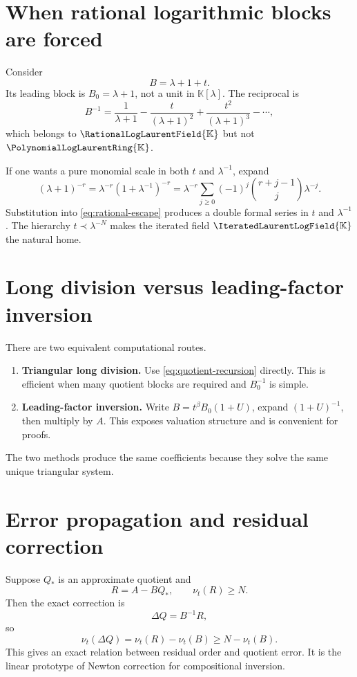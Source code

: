 \documentclass[11pt,openany]{book}
\theoremstyle{definition}
\theoremstyle{plain}
\theoremstyle{remark}
\newcommand{\K}{\mathbb{K}}
\newcommand{\Plog}{\PolynomialLogLaurentRing{\K}}
\newcommand{\Rlog}{\RationalLogLaurentField{\K}}
\newcommand{\Hlog}{\IteratedLaurentLogField{\K}}
\newcommand{\precdom}{\prec}
\newcommand{\val}{\nu}
\begin{document}
\section{When rational logarithmic blocks are forced}
Consider
\[
 B=\lambda+1+t.
\]
Its leading block is \(B_0=\lambda+1\), not a unit in \(\K[\lambda]\). The reciprocal is
\begin{equation}\label{eq:rational-escape}
 B^{-1}
 =\frac1{\lambda+1}
 -\frac{t}{(\lambda+1)^2}
 +\frac{t^2}{(\lambda+1)^3}-\cdots,
\end{equation}
which belongs to \(\Rlog\) but not \(\Plog\).

If one wants a pure monomial scale in both \(t\) and \(\lambda^{-1}\), expand
\[
 (\lambda+1)^{-r}
 =\lambda^{-r}(1+\lambda^{-1})^{-r}
 =\lambda^{-r}\sum_{j\ge0}(-1)^j
 \binom{r+j-1}{j}\lambda^{-j}.
\]
Substitution into \cref{eq:rational-escape} produces a double formal series in \(t\) and \(\lambda^{-1}\). The hierarchy \(t\precdom\lambda^{-N}\) makes the iterated field \(\Hlog\) the natural home.

\section{Long division versus leading-factor inversion}
There are two equivalent computational routes.

\begin{enumerate}
\item \textbf{Triangular long division.} Use \cref{eq:quotient-recursion} directly. This is efficient when many quotient blocks are required and \(B_0^{-1}\) is simple.
\item \textbf{Leading-factor inversion.} Write \(B=t^\beta B_0(1+U)\), expand \((1+U)^{-1}\), then multiply by \(A\). This exposes valuation structure and is convenient for proofs.
\end{enumerate}

The two methods produce the same coefficients because they solve the same unique triangular system.

\section{Error propagation and residual correction}
Suppose \(Q_*\) is an approximate quotient and
\[
 R=A-BQ_*,\qquad \val_t(R)\ge N.
\]
Then the exact correction is
\begin{equation}\label{eq:quotient-correction}
 \Delta Q=B^{-1}R,
\end{equation}
so
\[
 \val_t(\Delta Q)=\val_t(R)-\val_t(B)
 \ge N-\val_t(B).
\]
This gives an exact relation between residual order and quotient error. It is the linear prototype of Newton correction for compositional inversion.
\end{document}
